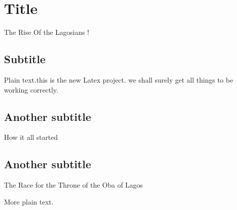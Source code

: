 \documentclass{article}
\begin{document}
\section{Title}The Rise Of the Lagosians !

\subsection{Subtitle}

Plain text.this is the new Latex project. we shall surely get all things to be
working correctly.

\subsection{Another subtitle}How it all started

\subsection{Another subtitle}The Race for the Throne of the Oba of Lagos

More plain text.
\end{document}
